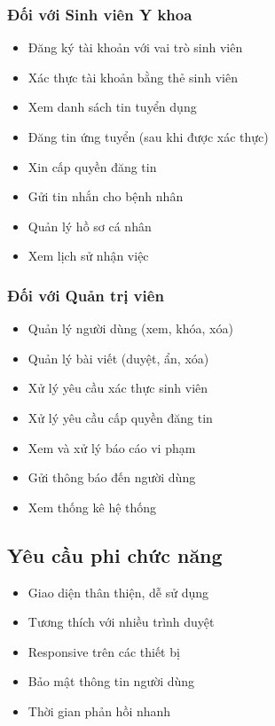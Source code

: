 \documentclass[a4paper,13pt]{extreport}
\begin{document}
\subsubsection{Đối với Sinh viên Y khoa}
\begin{itemize}
    \item Đăng ký tài khoản với vai trò sinh viên
    \item Xác thực tài khoản bằng thẻ sinh viên
    \item Xem danh sách tin tuyển dụng
    \item Đăng tin ứng tuyển (sau khi được xác thực)
    \item Xin cấp quyền đăng tin
    \item Gửi tin nhắn cho bệnh nhân
    \item Quản lý hồ sơ cá nhân
    \item Xem lịch sử nhận việc
\end{itemize}

\subsubsection{Đối với Quản trị viên}
\begin{itemize}
    \item Quản lý người dùng (xem, khóa, xóa)
    \item Quản lý bài viết (duyệt, ẩn, xóa)
    \item Xử lý yêu cầu xác thực sinh viên
    \item Xử lý yêu cầu cấp quyền đăng tin
    \item Xem và xử lý báo cáo vi phạm
    \item Gửi thông báo đến người dùng
    \item Xem thống kê hệ thống
\end{itemize}

\subsection{Yêu cầu phi chức năng}
\begin{itemize}
    \item Giao diện thân thiện, dễ sử dụng
    \item Tương thích với nhiều trình duyệt
    \item Responsive trên các thiết bị
    \item Bảo mật thông tin người dùng
    \item Thời gian phản hồi nhanh
\end{itemize}
\end{document}
